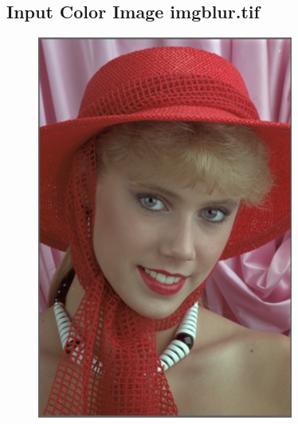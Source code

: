 \documentclass{article}
\begin{document}
\subsection{Input Color Image imgblur.tif}
\begin{figure}[H]
    \centering
    \includegraphics[width=0.75\textwidth]{../results/imgblur.png}
    \begin{center}
    \end{center}
    \label{fig:A1}
\end{figure}
\end{document}

